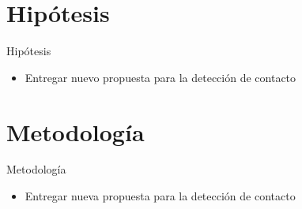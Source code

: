 \documentclass[11pt]{beamer}
\begin{document}
\section{Hipótesis}
\begin{frame}{Hipótesis}
\begin{itemize}
    \item Entregar nuevo propuesta para la detección de contacto
\end{itemize}
\end{frame}

\section{Metodología}
\begin{frame}{Metodología}
\begin{itemize}
    \item Entregar nueva propuesta para la detección de contacto
\end{itemize}
\end{frame}

\medskip


\end{document}
